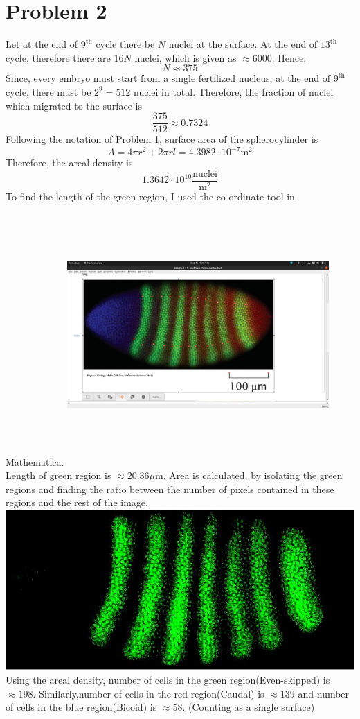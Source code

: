 \documentclass{article}
\begin{document}
\section{Problem 2}
    Let at the end of $9^{\text{th}}$ cycle there be $N$ nuclei at the surface. At the end of $13^{\text{th}}$ cycle, therefore there are $16N$ nuclei, which is given as $\approx 6000$. Hence, $$N \approx 375$$
    Since, every embryo must start from a single fertilized nucleus, at the end of $9^{\text{th}}$ cycle, there must be $2^{9} = 512$ nuclei in total. Therefore, the fraction of nuclei which migrated to the surface is$$\frac{375}{512} \approx 0.7324$$
    Following the notation of Problem 1, surface area of the spherocylinder is $$A=4\pi r^{2} + 2\pi r l = 4.3982\cdot 10^{-7} \text{m}^{2}$$ 
    Therefore, the areal density is $$1.3642\cdot10^{10} \frac{\text{nuclei}}{\text{m}^2}$$
    To find the length of the green region, I used the co-ordinate tool in Mathematica. \newline
	\includegraphics[width=10cm,height=10cm]{Screenshot from 2020-08-15 15-07-25.png} \newline
	Length of green region is
	$\approx 20.36 \mu \text{m}$. 
	Area is calculated, by isolating the green regions and finding the ratio between the number of pixels contained in these regions and the rest of the image. \newline
	\includegraphics{bio.jpeg}
	\newline
	Using the areal density, number of cells in the green region(Even-skipped) is $\approx 198$.
	Similarly,number of cells in the red region(Caudal) is $\approx 139$ and number of cells in the blue region(Bicoid) is $\approx 58$. (Counting as a single surface)
\end{document}
